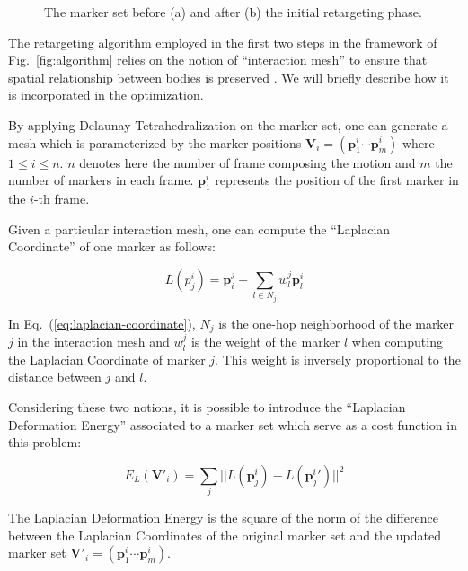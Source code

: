 \documentclass[letterpaper, 10 pt, conference]{ieeeconf}  %
\begin{document}
\begin{figure}[htbp!]
  \vspace*{3cm}
  \label{fig:retargeting}
  \caption{The marker set before (a) and after (b) the initial
    retargeting phase.}
\end{figure}

The retargeting algorithm employed in the first two steps in the
framework of Fig.~\ref{fig:algorithm} relies on 
the notion of ``interaction mesh'' to ensure that 
spatial relationship between bodies is preserved
\cite{Nakaoka12Humanoids}. 
We will briefly describe how it is incorporated in the optimization.

By applying Delaunay Tetrahedralization \cite{Si2005} on the marker
set, one can generate a mesh which is parameterized by the marker
positions $\mathbf{V}_i = (\mathbf{p}^i_1 \cdots \mathbf{p}^i_m)$
where $1 \leq i \leq n$. $n$ denotes here the number of frame
composing the motion and $m$ the number of markers in each
frame. $\mathbf{p}^i_1$ represents the position of the first marker in
the $i$-th frame.

Given a particular interaction mesh, one can compute the ``Laplacian
Coordinate'' of one marker as follows:

\begin{equation}\label{eq:laplacian-coordinate}
L(p^i_j) = \mathbf{p}_i^j - \sum_{l \in N_j} w^j_l \mathbf{p}^i_l
\end{equation}

In Eq.~(\ref{eq:laplacian-coordinate}), $N_j$ is the one-hop
neighborhood of the marker $j$ in the interaction mesh and $w^j_l$ is the
weight of the marker $l$ when computing the Laplacian Coordinate of
marker $j$. This weight is inversely proportional to the distance
between $j$ and $l$.

Considering these two notions, it is possible to introduce the
``Laplacian Deformation Energy'' associated to a marker set which
serve as a cost function in this problem:

\begin{equation}
E_L(\mathbf{V'}_i) = \sum_j || L(\mathbf{p}^i_j) - L(\mathbf{p}^i_j{}') ||^2
\end{equation}

The Laplacian Deformation Energy is the square of the norm of the
difference between the Laplacian Coordinates of the original marker
set and the updated marker set $\mathbf{V}'_i = (\mathbf{p}^i_1 \cdots
\mathbf{p}^i_m)$.
\end{document}
